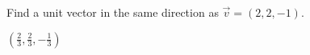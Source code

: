 
\begin{Exercise}[
name={},
title={}, 
difficulty=0,
origin={\cite{SM}}]
Find a unit vector in the same direction as $\vec{v} = (2,2,-1)$.
\end{Exercise}

\begin{Answer}
$\left(\frac{2}{3},\frac{2}{3},-\frac{1}{3}\right)$
\end{Answer}
